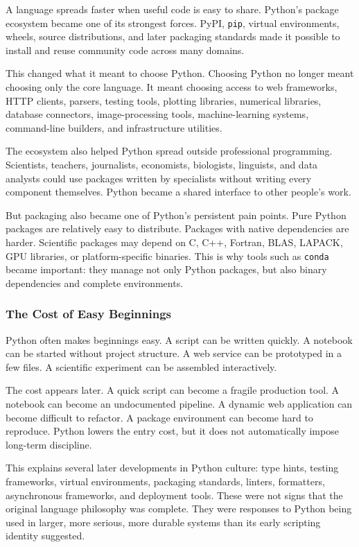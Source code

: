 A language spreads faster when useful code is easy to share. Python's package ecosystem became one of its strongest forces. PyPI, \texttt{pip}, virtual environments, wheels, source distributions, and later packaging standards made it possible to install and reuse community code across many domains.

This changed what it meant to choose Python. Choosing Python no longer meant choosing only the core language. It meant choosing access to web frameworks, HTTP clients, parsers, testing tools, plotting libraries, numerical libraries, database connectors, image-processing tools, machine-learning systems, command-line builders, and infrastructure utilities.

The ecosystem also helped Python spread outside professional programming. Scientists, teachers, journalists, economists, biologists, linguists, and data analysts could use packages written by specialists without writing every component themselves. Python became a shared interface to other people's work.

But packaging also became one of Python's persistent pain points. Pure Python packages are relatively easy to distribute. Packages with native dependencies are harder. Scientific packages may depend on C, C++, Fortran, BLAS, LAPACK, GPU libraries, or platform-specific binaries. This is why tools such as \texttt{conda} became important: they manage not only Python packages, but also binary dependencies and complete environments.

\subsubsection{The Cost of Easy Beginnings}

Python often makes beginnings easy. A script can be written quickly. A notebook can be started without project structure. A web service can be prototyped in a few files. A scientific experiment can be assembled interactively.

The cost appears later. A quick script can become a fragile production tool. A notebook can become an undocumented pipeline. A dynamic web application can become difficult to refactor. A package environment can become hard to reproduce. Python lowers the entry cost, but it does not automatically impose long-term discipline.

This explains several later developments in Python culture: type hints, testing frameworks, virtual environments, packaging standards, linters, formatters, asynchronous frameworks, and deployment tools. These were not signs that the original language philosophy was complete. They were responses to Python being used in larger, more serious, more durable systems than its early scripting identity suggested.

